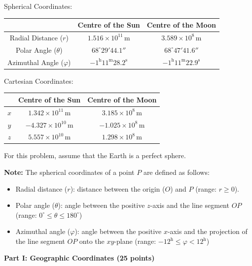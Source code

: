 Spherical Coordinates:
\begin{center}
\begin{tabular}{c|c|c}
 & Centre of the Sun & Centre of the Moon \\
\hline
Radial Distance ($r$) & $1.516 \times 10^{11}$\,m
  & $3.589 \times 10^{8}$\,m \\
Polar Angle ($\theta$) & $68^\circ 29' 44.1''$ & $68^\circ 47' 41.6''$ \\
Azimuthal Angle ($\varphi$) & $-1^{\mathrm{h}}11^{\mathrm{m}}28.2^{\mathrm{s}}$
  & $-1^{\mathrm{h}}11^{\mathrm{m}}22.9^{\mathrm{s}}$ \\
\end{tabular}
\end{center}

Cartesian Coordinates:
\begin{center}
\begin{tabular}{c|c|c}
 & Centre of the Sun & Centre of the Moon \\
\hline
$x$ & $1.342 \times 10^{11}$\,m & $3.185 \times 10^{8}$\,m \\
$y$ & $-4.327 \times 10^{10}$\,m & $-1.025 \times 10^{8}$\,m \\
$z$ & $5.557 \times 10^{10}$\,m & $1.298 \times 10^{8}$\,m \\
\end{tabular}
\end{center}

For this problem, assume that the Earth is a perfect sphere.

\textbf{Note:} The spherical coordinates of a point $P$ are defined as
follows:
\begin{itemize}
\item Radial distance ($r$): distance between the origin ($O$) and $P$
  (range: $r \geq 0$).
\item Polar angle ($\theta$): angle between the positive $z$-axis and the
  line segment $OP$ (range: $0^\circ \leq \theta \leq 180^\circ$)
\item Azimuthal angle ($\varphi$): angle between the positive $x$-axis and
  the projection of the line segment $OP$ onto the $xy$-plane (range:
  $-12^{\mathrm{h}} \leq \varphi < 12^{\mathrm{h}}$)
\end{itemize}


\textbf{Part I: Geographic Coordinates (25 points)}

